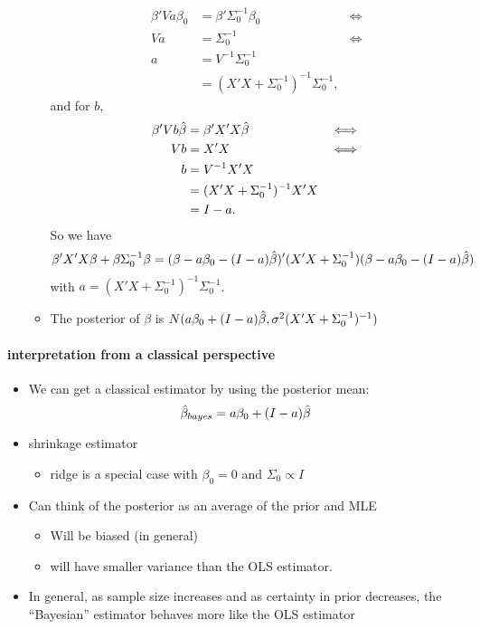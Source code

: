 \begin{itemize}
\begin{itemize}
\begin{align*}
    \beta'V a \beta_0 &= \beta'\Sigma_0^{-1}\beta_0 & \iff \\
    V a      &= \Sigma_0^{-1}     & \iff \\
    a        &= V^{-1} \Sigma_0^{-1} \\
             &= (X'X + \Sigma_0^{-1})^{-1} \Sigma_0^{-1},
  \end{align*}
  and for $b$,
  \begin{align*}
    \beta'V b \hat{\beta} &= \beta'X'X \hat{\beta} & \iff \\
    V b       &= X'X & \iff \\
    b         &= V^{-1} X'X \\
              &= (X'X + \Sigma_0^{-1})^{-1} X'X \\
              &= I - a.
  \end{align*}
  So we have 
  \[\beta'X'X\beta + \beta \Sigma_0^{-1} \beta  = (\beta - a \beta_0 - (I - a) \hat{\beta})'(X'X + \Sigma_0^{-1}) (\beta - a \beta_0 - (I - a) \hat{\beta})\] 
  with $a = (X'X + \Sigma_0^{-1})^{-1}\Sigma_0^{-1}$.
\item The posterior of $\beta$ is $N(a \beta_0 + (I - a)\hat{\beta}, \sigma^2 (X'X + \Sigma_0^{-1})^{-1})$
\end{itemize}
\end{itemize}

\paragraph{interpretation from a classical perspective}
\begin{itemize}
\item We can get a classical estimator by using the posterior mean:
  \[ \hat{\beta}_{bayes} = a\beta_0 + (I-a)\hat{\beta} \]
\item shrinkage estimator
\begin{itemize}
\item ridge is a special case with $\beta_0 = 0$ and $\Sigma_0 \propto I$
\end{itemize}
\item Can think of the posterior as an average of the prior and MLE
\begin{itemize}
\item Will be biased (in general)
\item will have smaller variance than the OLS estimator.
\end{itemize}
\item In general, as sample size increases and as certainty in
        prior decreases, the ``Bayesian'' estimator behaves more like the
        OLS estimator
\end{itemize}


